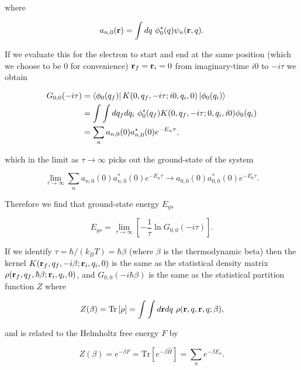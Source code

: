 where

\begin{equation}
    a_{n,0}(\vb{r}) = \int dq\ \phi^*_0(q) 
    \psi_n(\vb{r}, q).
\end{equation}

If we evaluate this for the electron to start and end at the same position (which we choose to be $0$ for convenience) $\vb{r}_f = \vb{r}_i = 0$ from imaginary-time $i0$ to $-i\tau$ we obtain

\begin{equation}
    \begin{aligned}
    G_{0,0}(-i\tau) &= \bra{\phi_0(q_f)} K(0, q_f, -i\tau; i0, q_i, 0) \ket{\phi_0(q_i)} \\
    &= \int\int dq_f dq_i\ \phi_0^*(q_f) K(0, q_f, -i\tau; 0, q_i, i0) \phi_0(q_i) \\
    &= \sum_n a_{n,0}(0) a^*_{n,0}(0) e^{-E_n \tau},
    \end{aligned}
\end{equation}

which in the limit as $\tau \to \infty$ picks out the ground-state of the system

\begin{equation}
    \lim_{\tau \to \infty} \sum_n a_{n,0}(0) a^*_{n,0}(0) e^{-E_n \tau} \rightarrow a_{0,0}(0) a^*_{0,0}(0) e^{-E_0 \tau}.
\end{equation}

Therefore we find that ground-state energy $E_{gs}$

\begin{equation}
    E_{gs} = \lim_{\tau \to \infty} \left[-\frac{1}{\tau} \ln G_{0,0}(-i\tau) \right].
\end{equation}

If we identify $\tau = \hbar /(k_B T) = \hbar\beta$ (where $\beta$ is the thermodynamic beta) then the kernel $K(\vb{r}_{f}, q_f, -i\beta; \vb{r}_{i}, q_i, 0)$ is the same as the statistical density matrix $\rho(\vb{r}_{f}, q_f, \hbar\beta; \vb{r}_{i}, q_i, 0)$, and $G_{0,0}(-i\hbar\beta)$ is the same as the statistical partition function $Z$ where

\begin{equation}
    Z(\beta) = \textrm{Tr} \left[\rho\right] = \int \int d\vb{r} dq\ \rho(\vb{r}, q, \vb{r}, q; \beta),
\end{equation}

and is related to the Helmholtz free energy $F$ by

\begin{equation}
    Z(\beta) = e^{-\beta F} = \textrm{Tr}\left[ e^{-\beta \hat{H}}\right] = \sum_n e^{-\beta E_n}.
\end{equation}

